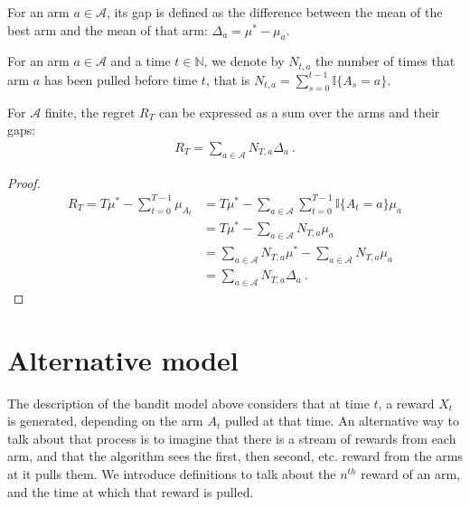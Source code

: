 \begin{definition}\label{def:gap}
  \leanok
For an arm $a \in \mathcal{A}$, its gap is defined as the difference between the mean of the best arm and the mean of that arm: $\Delta_a = \mu^* - \mu_a$.
\end{definition}


\begin{definition}\label{def:pullCount}
  \leanok
For an arm $a \in \mathcal{A}$ and a time $t \in \mathbb{N}$, we denote by $N_{t,a}$ the number of times that arm $a$ has been pulled before time $t$, that is $N_{t,a} = \sum_{s=0}^{t-1} \mathbb{I}\{A_s = a\}$.
\end{definition}


\begin{lemma}\label{lem:regret_eq_sum_pullCount_mul_gap}
  \leanok
For $\mathcal{A}$ finite, the regret $R_T$ can be expressed as a sum over the arms and their gaps:
\begin{align*}
  R_T = \sum_{a \in \mathcal{A}} N_{T,a} \Delta_a \: .
\end{align*}
\end{lemma}

\begin{proof}
  \leanok
\begin{align*}
  R_T = T \mu^* - \sum_{t=0}^{T-1} \mu_{A_t}
  &= T \mu^* - \sum_{a \in \mathcal{A}} \sum_{t=0}^{T-1} \mathbb{I}\{A_t = a\} \mu_a
  \\
  &= T \mu^* - \sum_{a \in \mathcal{A}} N_{T,a} \mu_a
  \\
  &= \sum_{a \in \mathcal{A}} N_{T,a} \mu^* - \sum_{a \in \mathcal{A}} N_{T,a} \mu_a
  \\
  &= \sum_{a \in \mathcal{A}} N_{T,a} \Delta_a
  \: .
\end{align*}
\end{proof}


\section{Alternative model}

The description of the bandit model above considers that at time $t$, a reward $X_t$ is generated, depending on the arm $A_t$ pulled at that time.
An alternative way to talk about that process is to imagine that there is a stream of rewards from each arm, and that the algorithm sees the first, then second, etc. reward from the arms at it pulls them.
We introduce definitions to talk about the $n^{th}$ reward of an arm, and the time at which that reward is pulled.

